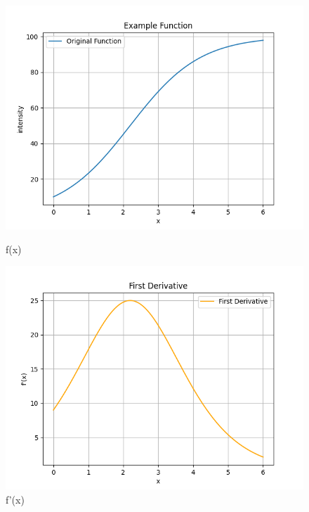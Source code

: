 \begin{figure}[htbp]
    \centering
    \begin{minipage}[b]{0.32\textwidth}
        \centering
        \includegraphics[width=\textwidth]{./fig/original_function.png}
        \caption{f(x)}
        \label{fig:original_function}
    \end{minipage}
    \begin{minipage}[b]{0.32\textwidth}
        \centering
        \includegraphics[width=\textwidth]{./fig/first_derivative.png}
        \caption{f'(x)}
        \label{fig:first_derivative}
    \end{minipage}
    \begin{minipage}[b]{0.32\textwidth}

\end{minipage}
\end{figure}
